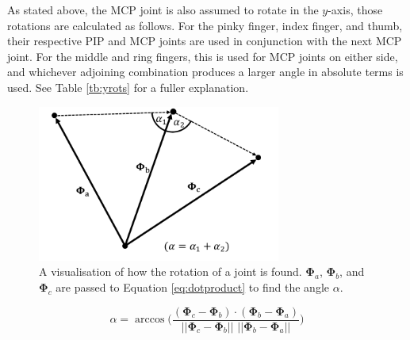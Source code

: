As stated above, the MCP joint is also assumed to rotate in the $y$-axis, those rotations are calculated as follows. For the pinky finger, index finger, and thumb, their respective PIP and MCP joints are used in conjunction with the next MCP joint. For the middle and ring fingers, this is used for MCP joints on either side, and whichever adjoining combination produces a larger angle in absolute terms is used. See Table \ref{tb:yrots} for a fuller explanation.

\begin{figure}
    \centering
    \includegraphics[width=8cm]{figs/general/ik.pdf}
    \caption{A visualisation of how the rotation of a joint is found. $\bm{\Phi}_a$, $\bm{\Phi}_b$, and $\bm{\Phi}_c$ are passed to Equation \ref{eq:dotproduct} to find the angle $\alpha$.}
    \label{fig:sd:ikvis}
\end{figure}

\begin{equation}
    \alpha = \arccos\Bigg({\frac{(\bm{\Phi}_c - \bm{\Phi}_b) \cdot (\bm{\Phi}_b - \bm{\Phi}_a)}{||\bm{\Phi}_c - \bm{\Phi}_b||\,\, ||\bm{\Phi}_b - \bm{\Phi}_a||}}\Bigg)
    \label{eq:dotproduct}
\end{equation}


